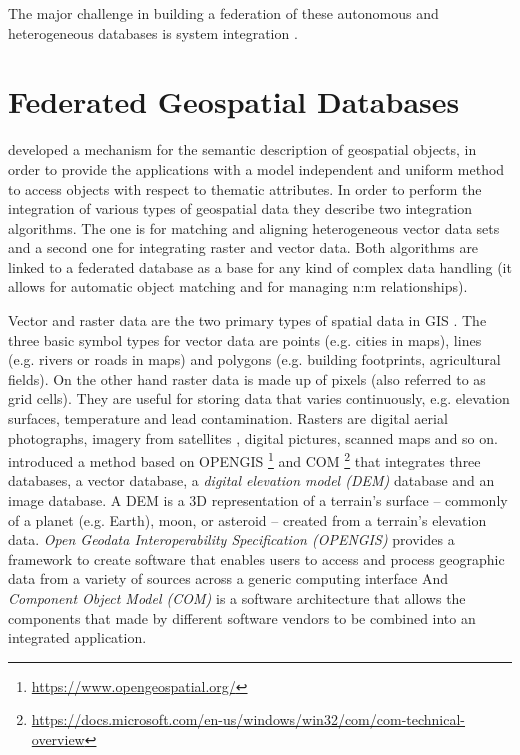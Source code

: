 \documentclass[12pt,a4paper]{report}
\newcommand{\term}{\textit}
\newcommand{\acr}{\MakeUppercase}
\begin{document}
	The major challenge in building a federation of these autonomous and heterogeneous databases is system integration \citep{Malik}.
	\\



	\chapter{Federated Geospatial Databases}
	\label{sec:fed_geodata}

	\citet{Butenuth} developed a mechanism for the semantic description of 
	geospatial objects, in order to provide the applications with a model 
	independent and uniform method to access objects with respect to thematic 
	attributes. In order to perform the integration of various types of 
	geospatial data they describe two integration algorithms. The one is for 
	matching and aligning heterogeneous vector data sets and a second one for 
	integrating raster and vector data. Both algorithms are linked to a 
	federated database as a base for any kind of complex data handling (it 
	allows for automatic object matching and for managing n:m relationships).
	\par
	Vector and raster data are the two primary types of spatial data in 
	\acr{gis} \citep{gisGeography}. The three basic symbol types for vector 
	data are points (e.g. cities in maps), lines (e.g. rivers or roads in maps) 
	and polygons (e.g. building footprints, agricultural fields). On the other 
	hand raster data is made up of pixels (also referred to as grid cells). 
	They are useful for storing data that varies continuously, e.g. elevation 
	surfaces, temperature and lead contamination. Rasters are digital aerial 
	photographs, imagery from satellites \citep{Butenuth}, digital pictures, 
	scanned maps and so on.
	\\

	\citet{Jian} introduced a method based on \acr{opengis} 
	\footnote{ \url{https://www.opengeospatial.org/}} and \acr{com} 
	\footnote{ \url{https://docs.microsoft.com/en-us/windows/win32/com/com-technical-overview}} 
	that integrates three databases, a vector database, a 
	\term{digital elevation model (\acr{dem})} database and an image database. 
	A \acr{dem} is a 3D representation of a terrain's surface – commonly of a 
	planet (e.g. Earth), moon, or asteroid – created from a terrain's elevation 
	data. \term{Open Geodata Interoperability Specification (\acr{opengis})} 
	provides a framework to create software that enables users to access and 
	process geographic data from a variety of sources across a generic computing 
	interface And \term{Component Object Model (\acr{com})} is a software 
	architecture that allows the components that made by different software 
	vendors to be combined into an integrated application. 
	\\
\end{document}
